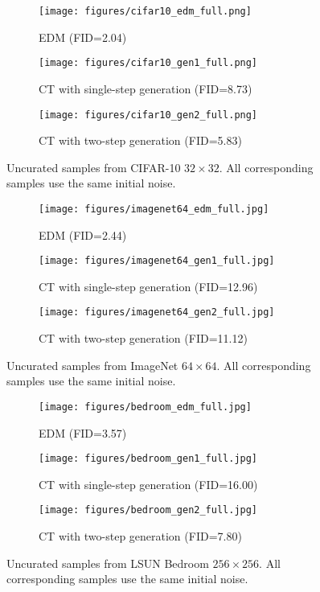 \begin{appendices}
\begin{figure}
    \centering
    \begin{subfigure}[b]{\textwidth}
        \texttt{[image: figures/cifar10\_edm\_full.png]}
        \caption{EDM (FID=2.04)}
    \end{subfigure}
    \begin{subfigure}[b]{\textwidth}
        \texttt{[image: figures/cifar10\_gen1\_full.png]}
        \caption{CT with single-step generation (FID=8.73)}
    \end{subfigure}
    \begin{subfigure}[b]{\textwidth}
        \texttt{[image: figures/cifar10\_gen2\_full.png]}
        \caption{CT with two-step generation (FID=5.83)}
    \end{subfigure}
    \caption{Uncurated samples from CIFAR-10 $32\times 32$. All corresponding samples use the same initial noise.}
    \label{fig:cifar10_full}
\end{figure}

\begin{figure}
    \centering
    \begin{subfigure}[b]{\textwidth}
        \texttt{[image: figures/imagenet64\_edm\_full.jpg]}
        \caption{EDM (FID=2.44)}
    \end{subfigure}
    \begin{subfigure}[b]{\textwidth}
        \texttt{[image: figures/imagenet64\_gen1\_full.jpg]}
        \caption{CT with single-step generation (FID=12.96)}
    \end{subfigure}
    \begin{subfigure}[b]{\textwidth}
        \texttt{[image: figures/imagenet64\_gen2\_full.jpg]}
        \caption{CT with two-step generation (FID=11.12)}
    \end{subfigure}
    \caption{Uncurated samples from ImageNet $64\times 64$. All corresponding samples use the same initial noise.}
    \label{fig:imagenet64_full}
\end{figure}


\begin{figure}
    \centering
    \begin{subfigure}[b]{\textwidth}
        \texttt{[image: figures/bedroom\_edm\_full.jpg]}
        \caption{EDM (FID=3.57)}
    \end{subfigure}
    \begin{subfigure}[b]{\textwidth}
        \texttt{[image: figures/bedroom\_gen1\_full.jpg]}
        \caption{CT with single-step generation (FID=16.00)}
    \end{subfigure}
    \begin{subfigure}[b]{\textwidth}
        \texttt{[image: figures/bedroom\_gen2\_full.jpg]}
        \caption{CT with two-step generation (FID=7.80)}
    \end{subfigure}
    \caption{Uncurated samples from LSUN Bedroom $256\times 256$. All corresponding samples use the same initial noise.}
    \label{fig:bedroom_full}
\end{figure}


\end{appendices}
